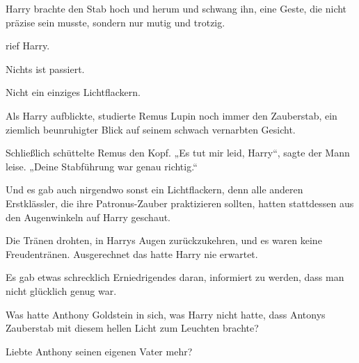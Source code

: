 Harry brachte den Stab hoch und herum und schwang ihn, eine Geste, die nicht präzise sein musste, sondern nur mutig und trotzig.

 rief Harry.

Nichts ist passiert.

Nicht ein einziges Lichtflackern.

Als Harry aufblickte, studierte Remus Lupin noch immer den Zauberstab, ein ziemlich beunruhigter Blick auf seinem schwach vernarbten Gesicht.

Schließlich schüttelte Remus den Kopf.
„Es tut mir leid, Harry“, sagte der Mann leise.
„Deine Stabführung war genau richtig.“

Und es gab auch nirgendwo sonst ein Lichtflackern, denn alle anderen Erstklässler, die ihre Patronus-Zauber praktizieren sollten, hatten stattdessen aus den Augenwinkeln auf Harry geschaut.

Die Tränen drohten, in Harrys Augen zurückzukehren, und es waren keine Freudentränen. Ausgerechnet das hatte Harry nie erwartet.

Es gab etwas schrecklich Erniedrigendes daran, informiert zu werden, dass man nicht glücklich genug war.

Was hatte Anthony Goldstein in sich, was Harry nicht hatte, dass Antonys Zauberstab mit diesem hellen Licht zum Leuchten brachte?

Liebte Anthony seinen eigenen Vater mehr?

